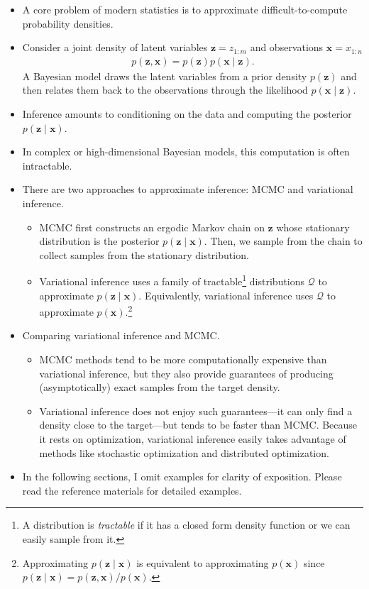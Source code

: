 \documentclass[10pt]{article}
\newcommand{\QQ}{\mathcal{Q}}
\begin{document}
\begin{itemize}
\item A core problem of modern statistics is to approximate difficult-to-compute probability densities.
\item Consider a joint density of latent variables $\bm{z} = z_{1:m}$ and observations $\bm{x} = x_{1:n}$
\begin{align*}
p(\bm{z},\bm{x}) = p(\bm{z}) p(\bm{x} \mid \bm{z}).
\end{align*}
A Bayesian model draws the latent variables from a prior density $p(\bm{z})$ and then relates them back to the observations through the likelihood $p(\bm{x} \mid \bm{z})$.
\item Inference amounts to conditioning on the data and computing the posterior $p(\bm{z} \mid \bm{x})$.
\item In complex or high-dimensional Bayesian models, this computation is often intractable.
\item There are two approaches to approximate inference: MCMC and variational inference.
\begin{itemize}
\item MCMC first constructs an ergodic Markov chain on $\bm{z}$ whose stationary distribution is the posterior $p(\bm{z} \mid \bm{x})$. Then, we sample from the chain to collect samples from the stationary distribution.
\item Variational inference uses a family of tractable\footnote{A distribution is \textit{tractable} if it has a closed form density function or we can easily sample from it.} distributions $\QQ$ to approximate $p(\bm{z} \mid \bm{x})$. Equivalently, variational inference uses $\QQ$ to approximate $p(\bm{x})$.\footnote{Approximating $p(\bm{z} \mid \bm{x})$ is equivalent to approximating $p(\bm{x})$ since $p(\bm{z} \mid \bm{x}) = p(\bm{z},\bm{x}) / p(\bm{x})$.}
\end{itemize}
\item Comparing variational inference and MCMC.
\begin{itemize}
\item MCMC methods tend to be more computationally expensive than variational inference, but they also provide guarantees of producing (asymptotically) exact samples from the target density.
\item Variational inference does not enjoy such guarantees---it can only find a density close to the target---but tends to be faster than MCMC. Because it rests on optimization, variational inference easily takes advantage of methods like stochastic optimization and distributed optimization.
\end{itemize}
\item In the following sections, I omit examples for clarity of exposition. Please read the reference materials for detailed examples.
\end{itemize}
\end{document}
